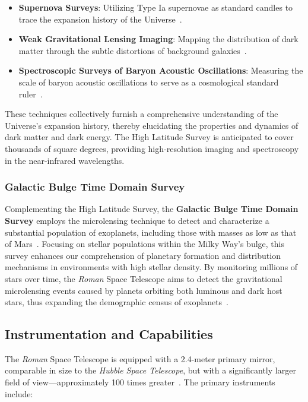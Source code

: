 \begin{itemize}
    \item \textbf{Supernova Surveys}: Utilizing Type Ia supernovae as standard candles to trace the expansion history of the Universe~\cite{2011ApJ...737..102S}.
    \item \textbf{Weak Gravitational Lensing Imaging}: Mapping the distribution of dark matter through the subtle distortions of background galaxies~\cite{2001PhR...340..291B}.
    \item \textbf{Spectroscopic Surveys of Baryon Acoustic Oscillations}: Measuring the scale of baryon acoustic oscillations to serve as a cosmological standard ruler~\cite{2005ApJ...633..560E}.
\end{itemize}

These techniques collectively furnish a comprehensive understanding of the Universe's expansion history, thereby elucidating the properties and dynamics of dark matter and dark energy. The High Latitude Survey is anticipated to cover thousands of square degrees, providing high-resolution imaging and spectroscopy in the near-infrared wavelengths.

\subsubsection{Galactic Bulge Time Domain Survey}

Complementing the High Latitude Survey, the \textbf{Galactic Bulge Time Domain Survey} employs the microlensing technique to detect and characterize a substantial population of exoplanets, including those with masses as low as that of Mars~\cite{2019ApJS..241....3P}. Focusing on stellar populations within the Milky Way's bulge, this survey enhances our comprehension of planetary formation and distribution mechanisms in environments with high stellar density. By monitoring millions of stars over time, the \emph{Roman} Space Telescope aims to detect the gravitational microlensing events caused by planets orbiting both luminous and dark host stars, thus expanding the demographic census of exoplanets~\cite{2012ARA&A..50..411G}.

\subsection{Instrumentation and Capabilities}

The \emph{Roman} Space Telescope is equipped with a 2.4-meter primary mirror, comparable in size to the \emph{Hubble Space Telescope}, but with a significantly larger field of view—approximately 100 times greater~\cite{2015arXiv150303757S}. The primary instruments include:

